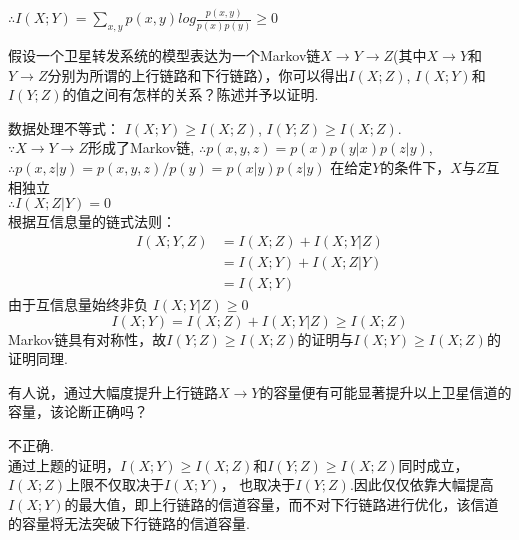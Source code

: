 \documentclass[a4paper]{exam}
\begin{document}
\begin{CJK*}{UTF8}{gbsn}
\begin{questions}
\begin{solution}
    $\therefore I(X;Y) = \sum\limits_{x,y} {p(x,y)log\frac{{p(x,y)}}{{p(x)p(y)}}}  \ge 0$
    \end{solution}
    \vspace{1.5cm}
    \question
假设一个卫星转发系统的模型表达为一个Markov链$X \to Y \to Z$(其中$X \to Y$和$Y \to Z$分别为所谓的上行链路和下行链路），你可以得出$I(X;Z)$, $I(X;Y)$和$I(Y;Z)$的值之间有怎样的关系？陈述并予以证明.
    \begin{solution}
    数据处理不等式： $I(X;Y) \ge I(X;Z)$, $I(Y;Z) \ge I(X;Z)$.\\
    $\because X \to Y \to Z$形成了Markov链,  $\therefore p(x,y,z) = p(x)p(y|x)p(z|y)$,\\
    $\therefore p(x,z|y) = p(x,y,z)/p(y) = p(x|y)p(z|y)$ 在给定$Y$的条件下，$X$与$Z$互相独立\\
    $\therefore I(X;Z|Y) = 0$\\
    根据互信息量的链式法则：
    \begin{equation*}
        \begin{split}
        I(X;Y,Z) &= I(X;Z) + I(X;Y|Z)\\
        & = I(X;Y) + I(X;Z|Y)\\
        & = I(X;Y)
        \end{split}
    \end{equation*}
    由于互信息量始终非负 $ I(X;Y|Z) \ge 0$\\
    \[ I(X;Y) = I(X;Z) + I(X;Y|Z) \ge I(X;Z)\]
    Markov链具有对称性，故$I(Y;Z) \ge I(X;Z)$的证明与$I(X;Y) \ge I(X;Z)$的证明同理.
    \end{solution}
    \vspace{1.5cm}
    \question
  有人说，通过大幅度提升上行链路$X \to Y$的容量便有可能显著提升以上卫星信道的容量，该论断正确吗？
    \begin{solution}
    不正确.\\
    通过上题的证明，$I(X;Y) \ge I(X;Z)$和$I(Y;Z) \ge I(X;Z)$同时成立，$I(X;Z)$上限不仅取决于$I(X;Y)$， 也取决于$I(Y;Z)$.因此仅仅依靠大幅提高$I(X;Y)$的最大值，即上行链路的信道容量，而不对下行链路进行优化，该信道的容量将无法突破下行链路的信道容量.
    \end{solution}
    \vspace{1.5cm}
\end{questions}


\end{CJK*}
\end{document}
